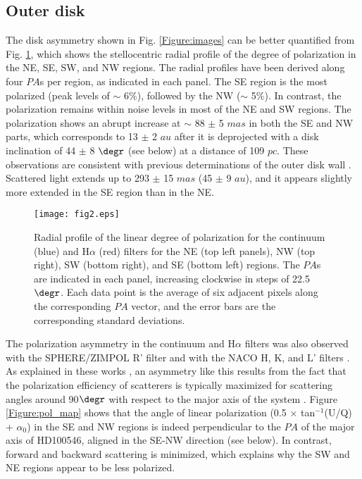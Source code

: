 \documentclass{aa}
\begin{document}
\subsection{Outer disk}
\label{Sect:geometry}
The disk asymmetry shown in Fig. \ref{Figure:images} can be better quantified from Fig. \ref{Figure:rad_azim_prof}, which shows the stellocentric radial profile of the degree of polarization in the NE, SE, SW, and NW regions. The radial profiles have been derived along four $PA$s per region, as indicated in each panel. The SE region is the most polarized (peak levels of $\sim$ 6$\%$), followed by the NW ($\sim$ 5$\%$). In contrast, the polarization remains within noise levels in most of the NE and SW regions. The polarization shows an abrupt increase at $\sim$ 88 $\pm$ 5 $mas$ in both the SE and NW parts, which corresponds to 13 $\pm$ 2 $au$ after it is deprojected with a disk inclination of 44 $\pm$ 8 $\degr$ (see below) at a distance of 109 $pc$. These observations are consistent with previous determinations of the outer disk wall \citep[see, e.g.,][and references therein]{Garufi16}. Scattered light extends up to 293 $\pm$ 15 $mas$ (45 $\pm$ 9 $au$), and it appears slightly more extended in the SE region than in the NE.

\begin{figure*}
[!hbtp]
\centering
\texttt{[image: fig2.eps]}
\caption{Radial profile of the linear degree of polarization for the continuum (blue) and H$\alpha$ (red) filters for the NE (top left panels), NW (top right), SW (bottom right), and SE (bottom left) regions. The $PA$s are indicated in each panel, increasing clockwise in steps of 22.5$\degr$. Each data point is the average of six adjacent pixels along the corresponding $PA$ vector, and the error bars are the corresponding standard deviations.} 
\label{Figure:rad_azim_prof}
\end{figure*}

The polarization asymmetry in the continuum and H$\alpha$ filters was also observed with the SPHERE/ZIMPOL R' filter \citep{Garufi16} and with the NACO H, K, and L' filters \citep{Avenhaus14}. As explained in these works \citep[see also the related discussion and the HD 100546 disk model in][]{Augereau99,Currie15}, an asymmetry like this results from the fact that the polarization efficiency of scatterers is typically maximized for scattering angles around 90$\degr$ with respect to the major axis of the system \citep[e.g.,][]{Perrin09,Murakawa10}. Figure \ref{Figure:pol_map} shows that the angle of linear polarization (0.5 $\times$ tan$^{-1}$(U/Q) + $\alpha$$_0$) in the SE and NW regions is indeed perpendicular to the $PA$ of the major axis of HD100546, aligned in the SE-NW direction (see below). In contrast, forward and backward scattering is minimized, which explains why the SW and NE regions appear to be less polarized.
\end{document}
